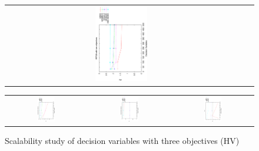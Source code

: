 \begin{figure}[h]
\begin{tabular}{ccc}
   \includegraphics[width=0.23\textwidth, angle=-90,origin=c]{Images/WFG8_2obj_Scalability.eps}  
\end{tabular}
\end{figure}

\begin{figure}[h]
\centering
\caption{Scalability study of decision variables with three objectives (HV)}
\label{fig:Scalability_Study_HV_1}
\begin{tabular}{ccc}
\includegraphics[width=0.23\textwidth, angle=-90,origin=c]{Images/DTLZ4_3obj_Scalability.eps} &
\includegraphics[width=0.23\textwidth, angle=-90,origin=c]{Images/DTLZ7_3obj_Scalability.eps} &
\includegraphics[width=0.23\textwidth, angle=-90,origin=c]{Images/UF10_Scalability.eps}  

\end{tabular}
\end{figure}
